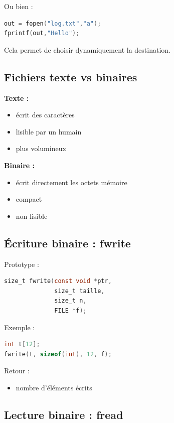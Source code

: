 Ou bien :

\begin{lstlisting}[language=C]
out = fopen("log.txt","a");
fprintf(out,"Hello");
\end{lstlisting}

Cela permet de choisir dynamiquement la destination.

\subsection{Fichiers texte vs binaires}

\textbf{Texte :}

\begin{itemize}
    \item écrit des caractères
    \item lisible par un humain
    \item plus volumineux
\end{itemize}

\textbf{Binaire :}

\begin{itemize}
    \item écrit directement les octets mémoire
    \item compact
    \item non lisible
\end{itemize}

\subsection{Écriture binaire : fwrite}

Prototype :

\begin{lstlisting}[language=C]
size_t fwrite(const void *ptr,
              size_t taille,
              size_t n,
              FILE *f);
\end{lstlisting}

Exemple :

\begin{lstlisting}[language=C]
int t[12];
fwrite(t, sizeof(int), 12, f);
\end{lstlisting}

Retour :

\begin{itemize}
    \item nombre d’éléments écrits
\end{itemize}

\subsection{Lecture binaire : fread}

